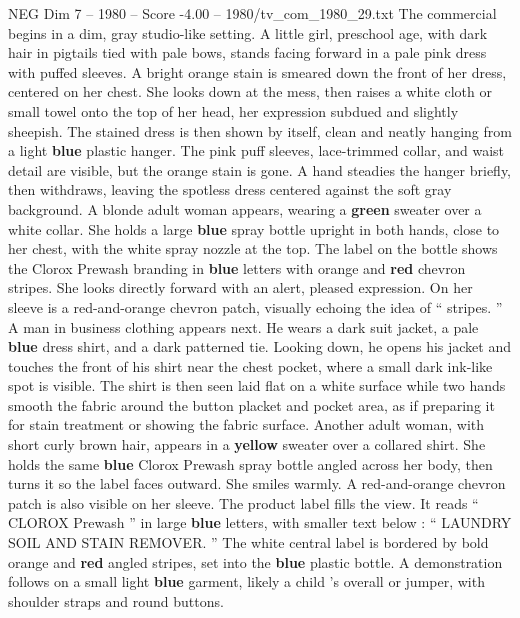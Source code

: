 \begin{textsample}{NEG Dim 7 – 1980 – Score -4.00 – 1980/tv\_com\_1980\_29.txt}  \label{ex:f7_neg_056}
The commercial begins in a dim, gray studio-like setting.
A little girl, preschool age, with dark hair in pigtails tied with pale bows, stands facing forward in a pale pink dress with puffed sleeves.
A bright orange stain is smeared down the front of her dress, centered on her chest.
She looks down at the mess, then raises a white cloth or small towel onto the top of her head, her expression subdued and slightly sheepish.
The stained dress is then shown by itself, clean and neatly hanging from a light \textbf{blue} plastic hanger.
The pink puff sleeves, lace-trimmed collar, and waist detail are visible, but the orange stain is gone.
A hand steadies the hanger briefly, then withdraws, leaving the spotless dress centered against the soft gray background.
A blonde adult woman appears, wearing a \textbf{green} sweater over a white collar.
She holds a large \textbf{blue} spray bottle upright in both hands, close to her chest, with the white spray nozzle at the top.
The label on the bottle shows the Clorox Prewash branding in \textbf{blue} letters with orange and \textbf{red} chevron stripes.
She looks directly forward with an alert, pleased expression.
On her sleeve is a red-and-orange chevron patch, visually echoing the idea of “ stripes. ” A man in business clothing appears next.
He wears a dark suit jacket, a pale \textbf{blue} dress shirt, and a dark patterned tie.
Looking down, he opens his jacket and touches the front of his shirt near the chest pocket, where a small dark ink-like spot is visible.
The shirt is then seen laid flat on a white surface while two hands smooth the fabric around the button placket and pocket area, as if preparing it for stain treatment or showing the fabric surface.
Another adult woman, with short curly brown hair, appears in a \textbf{yellow} sweater over a collared shirt.
She holds the same \textbf{blue} Clorox Prewash spray bottle angled across her body, then turns it so the label faces outward.
She smiles warmly.
A red-and-orange chevron patch is also visible on her sleeve.
The product label fills the view.
It reads “ CLOROX Prewash ” in large \textbf{blue} letters, with smaller text below : “ LAUNDRY SOIL AND STAIN REMOVER. ” The white central label is bordered by bold orange and \textbf{red} angled stripes, set into the \textbf{blue} plastic bottle.
A demonstration follows on a small light \textbf{blue} garment, likely a child ’s overall or jumper, with shoulder straps and round buttons.

\end{textsample}
